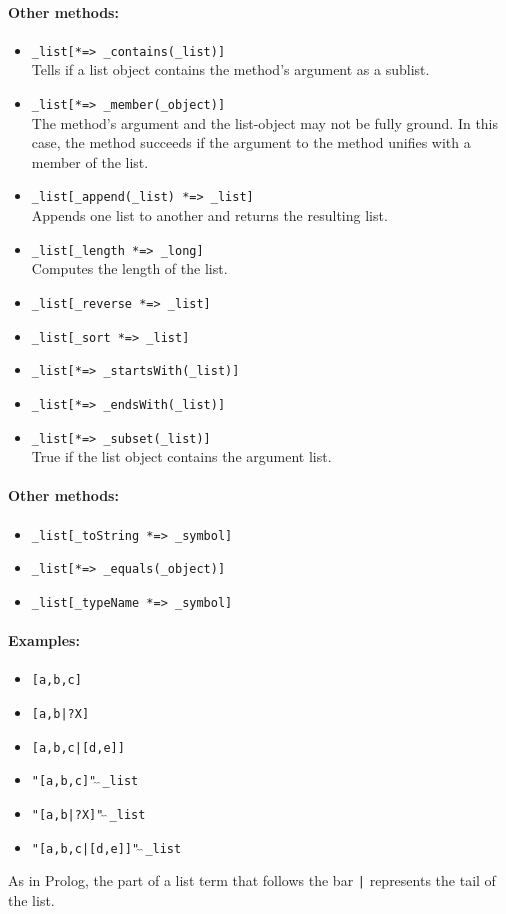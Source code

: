 \documentclass[11pt]{article}
\begin{document}
\paragraph{Other methods:}
\begin{itemize}
\item {\tt \_list[*=> \_contains(\_list)]} 
  \\
  Tells if a list object contains the method's argument as a sublist.
\item {\tt \_list[*=> \_member(\_object)]}  
  \\
  The method's argument and the list-object may not be fully ground. In this
  case, the method succeeds if the argument to the method unifies with a
  member of the list.
\item {\tt \_list[\_append(\_list) *=> \_list]}  \\
  Appends one list to another and returns the resulting list.
\item {\tt \_list[\_length *=> \_long]}  
  \\
  Computes the length of the list.
\item {\tt \_list[\_reverse *=> \_list]}  
\item {\tt \_list[\_sort *=> \_list]}  
\item {\tt \_list[*=> \_startsWith(\_list)]}  
\item {\tt \_list[*=> \_endsWith(\_list)]}  
\item {\tt \_list[*=> \_subset(\_list)]}  
  \\
  True if the list object contains the argument list.
\end{itemize}

\paragraph{Other methods:}
\begin{itemize}
\item {\tt \_list[\_toString *=> \_symbol]}  
\item {\tt \_list[*=> \_equals(\_object)]}  
\item {\tt \_list[\_typeName *=> \_symbol]}  
\end{itemize}

\paragraph{Examples:}
\begin{itemize}
\item {\tt [a,b,c]} 
\item {\tt [a,b|?X]}  
\item {\tt [a,b,c|[d,e]]} 
\item {\tt "[a,b,c]"$\hat{~}\hat{~}$\_list} 
\item {\tt "[a,b|?X]"$\hat{~}\hat{~}$\_list}  
\item {\tt "[a,b,c|[d,e]]"$\hat{~}\hat{~}$\_list} 
\end{itemize}
As in Prolog, the part of a list term that follows the bar \verb,|,
represents the tail of the list.
\end{document}
